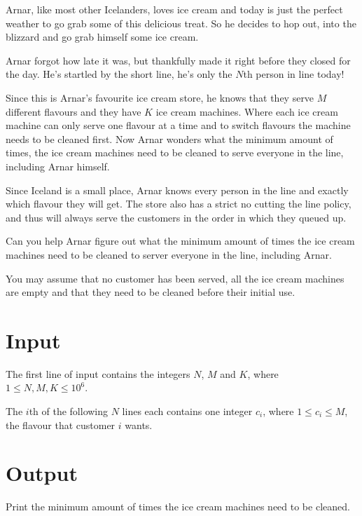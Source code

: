 Arnar, like most other Icelanders, loves ice cream and today is just the perfect
weather to go grab some of this delicious treat. So he decides to hop out, into
the blizzard and go grab himself some ice cream.

Arnar forgot how late it was, but thankfully made it right before they closed
for the day. He's startled by the short line, he's only the $N$th person in
line today!

Since this is Arnar's favourite ice cream store, he knows that they serve $M$
different flavours and they have $K$ ice cream machines.
Where each ice cream machine can only serve one flavour at a time and to switch
flavours the machine needs to be cleaned first.
Now Arnar wonders what the minimum amount of times, the ice cream machines
need to be cleaned to serve everyone in the line, including Arnar himself.

Since Iceland is a small place, Arnar knows every person in the line and exactly
which flavour they will get.
The store also has a strict no cutting the line policy, and thus will always serve
the customers in the order in which they queued up.

Can you help Arnar figure out what the minimum amount of times the ice cream
machines need to be cleaned to server everyone in the line, including Arnar.

You may assume that no customer has been served, all the ice cream machines
are empty and that they need to be cleaned before their initial use.

\section*{Input}
The first line of input contains the integers $N$, $M$ and $K$, where $1 \leq
N, M, K \leq 10^6$.

The $i$th of the following $N$ lines each contains one integer $c_i$,
where $1 \leq c_i \leq M$, the flavour that customer $i$ wants.

\section*{Output}
Print the minimum amount of times the ice cream machines need to be cleaned.

